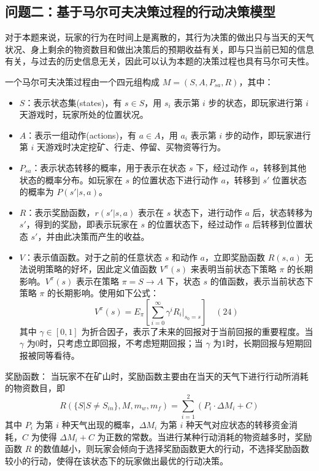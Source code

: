 \documentclass[UTF8]{article}
\begin{document}
\subsection*{问题二：基于马尔可夫决策过程的行动决策模型}
对于本题来说，玩家的行为在时间上是离散的，其行为决策的做出只与当天的天气状况、身上剩余的物资数目和做出决策后的预期收益有关，即与只当前已知的信息有关，与过去的历史信息无关，因此可以认为本题的决策过程也具有马尔可夫性。

一个马尔可夫决策过程由一个四元组构成 \(M = (S, A, P_{sa}, R)\)，其中：
\begin{itemize}
    \item \(S\)：表示状态集(states)，有 \(s \in S\)，用 \(s_i\) 表示第 \(i\) 步的状态，即玩家进行第 \(i\) 天游戏时，玩家所处的位置状况。
    \item \(A\)：表示一组动作(actions)，有 \(a \in A\)，用 \(a_i\) 表示第 \(i\) 步的动作，即玩家进行第 \(i\) 天游戏时决定挖矿、行走、停留、买物资等行为。
    \item \(P_{sa}\)：表示状态转移的概率，用于表示在状态 \(s\) 下，经过动作 \(a\)，转移到其他状态的概率分布。如玩家在 \(s\) 的位置状态下进行动作 \(a\)，转移到 \(s'\) 位置状态的概率为 \(P(s'|s,a)\)。
    \item \(R\)：表示奖励函数，\(r(s'|s,a)\) 表示在 \(s\) 状态下，进行动作 \(a\) 后，状态转移为 \(s'\)，得到的奖励，即表示玩家在 \(s\) 的位置状态下，经过动作 \(a\) 后转移到位置状态 \(s'\)，并由此决策而产生的收益。
    \item \(V\)：表示值函数。对于之前的任意状态 \(s\) 和动作 \(a\)，立即奖励函数 \(R(s,a)\) 无法说明策略的好坏，因此定义值函数 \(V^\pi(s)\) 来表明当前状态下策略 \(\pi\) 的长期影响。\(V^\pi(s)\) 表示在策略 \(\pi = S \rightarrow A\) 下，状态 \(s\) 的值函数，表示当前状态下策略 \(\pi\) 的长期影响。使用如下公式：
    \[
    V^\pi(s) = E_\pi\left[\sum_{i=0}^{\infty} \gamma^i R_i \big|_{s_0 = s}\right] \quad (24)
    \]
    其中 \(\gamma \in [0,1]\) 为折合因子，表示了未来的回报对于当前回报的重要程度。当 \(\gamma\) 为0时，只考虑立即回报，不考虑短期回报；当 \(\gamma\) 为1时，长期回报与短期回报被同等看待。
\end{itemize}
奖励函数：
当玩家不在矿山时，奖励函数主要由在当天的天气下进行行动所消耗的物资数目，即
\[
R(\{S|S\neq S_{in}\}, M, m_w, m_f) = \sum_{i=1}^{2}(P_i \cdot \Delta M_i + C)
\]
其中 \(P_i\) 为第 \(i\) 种天气出现的概率，\(\Delta M_i\) 为第 \(i\) 种天气对应状态的转移资金消耗，\(C\) 为使得 \(\Delta M_i + C\) 为正数的常数。当进行某种行动消耗的物资越多时，奖励函数 \(R\) 的数值越小，则玩家会倾向于选择奖励函数更大的行动，不选择奖励函数较小的行动，使得在该状态下的玩家做出最优的行动决策。
\end{document}
